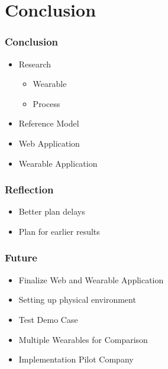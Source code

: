 \section{Conclusion}
\begin{frame}\frametitle{Conclusion}
	\begin{itemize}
		\item Research
		\begin{itemize}
			\item Wearable
			\item Process
		\end{itemize}
		\item Reference Model
		\item Web Application
		\item Wearable Application
	\end{itemize}
\end{frame}
\begin{frame}\frametitle{Reflection}
	\begin{itemize}
		\item Better plan delays
		\item Plan for earlier results
	\end{itemize}
\end{frame}
\begin{frame}\frametitle{Future}
	\begin{itemize}
		\item Finalize Web and Wearable Application
		\item Setting up physical environment
		\item Test Demo Case
	\end{itemize}
	\begin{itemize}
		\item Multiple Wearables for Comparison
		\item Implementation Pilot Company
	\end{itemize}
\end{frame}